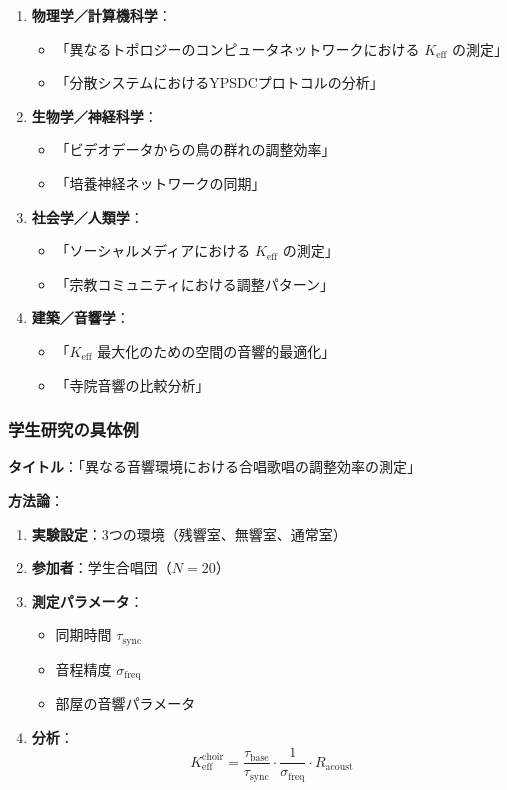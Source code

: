 \documentclass[12pt,a4paper]{article}
\begin{document}
	\begin{enumerate}
		\item \textbf{物理学／計算機科学}：
		\begin{itemize}
			\item 「異なるトポロジーのコンピュータネットワークにおける \(K_{\mathrm{eff}}\) の測定」
			\item 「分散システムにおけるYPSDCプロトコルの分析」
		\end{itemize}
		
		\item \textbf{生物学／神経科学}：
		\begin{itemize}
			\item 「ビデオデータからの鳥の群れの調整効率」
			\item 「培養神経ネットワークの同期」
		\end{itemize}
		
		\item \textbf{社会学／人類学}：
		\begin{itemize}
			\item 「ソーシャルメディアにおける \(K_{\mathrm{eff}}\) の測定」
			\item 「宗教コミュニティにおける調整パターン」
		\end{itemize}
		
		\item \textbf{建築／音響学}：
		\begin{itemize}
			\item 「\(K_{\mathrm{eff}}\) 最大化のための空間の音響的最適化」
			\item 「寺院音響の比較分析」
		\end{itemize}
	\end{enumerate}
	
	\subsubsection{学生研究の具体例}
	
	\textbf{タイトル}：「異なる音響環境における合唱歌唱の調整効率の測定」
	
	\textbf{方法論}：
	\begin{enumerate}
		\item \textbf{実験設定}：3つの環境（残響室、無響室、通常室）
		\item \textbf{参加者}：学生合唱団（$N=20$）
		\item \textbf{測定パラメータ}：
		\begin{itemize}
			\item 同期時間 $\tau_{\mathrm{sync}}$
			\item 音程精度 $\sigma_{\mathrm{freq}}$
			\item 部屋の音響パラメータ
		\end{itemize}
		\item \textbf{分析}：
		\[
		K_{\mathrm{eff}}^{\mathrm{choir}} = \frac{\tau_{\mathrm{base}}}{\tau_{\mathrm{sync}}} \cdot \frac{1}{\sigma_{\mathrm{freq}}} \cdot R_{\mathrm{acoust}}
		\]
	\end{enumerate}
	
\end{document}

